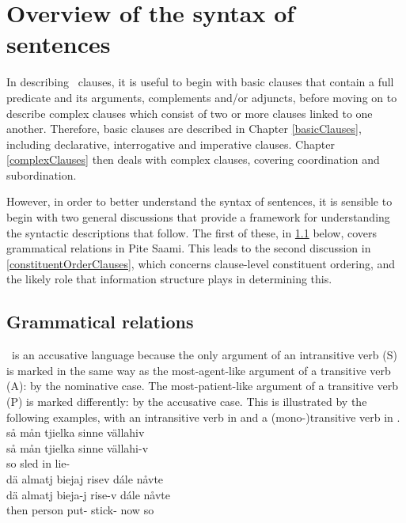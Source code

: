 


\chapter{Overview of the syntax of sentences}\label{overviewSyntax}
In describing \PS\ clauses, it is useful to begin with basic clauses that contain a full predicate and its arguments, complements and/or adjuncts, before moving on to describe complex clauses which consist of two or more clauses linked to one another. 
Therefore, basic clauses are described in Chapter \ref{basicClauses}, including declarative, interrogative and imperative clauses. Chapter \ref{complexClauses} then deals with complex clauses, covering coordination and subordination. 

However, in order to better understand the syntax of sentences, it is sensible to begin with two general discussions that provide a framework for understanding the syntactic descriptions that follow. The first of these, in \SEC\ref{grammaticalRelations} below, covers grammatical relations in Pite Saami. This leads to the second discussion in \SEC\ref{constituentOrderClauses}, which concerns clause-level constituent ordering, and the likely role that information structure plays in determining this.


\section{Grammatical relations}\label{grammaticalRelations}
\PS\ is an accusative language because %
the only argument of an intransitive verb (S) is marked in the same way as the most-agent-like argument of a transitive verb (A): by the nominative case. 
The most-patient-like argument of a transitive verb (P) is marked differently: by the accusative case. This is illustrated by the following examples, with an intransitive verb in  and a (mono-)transitive verb in .
\ea\label{intrans1}
\glll	så mån tjielka sinne vällahiv\\
	så mån tjielka sinne vällahi-v\\
	so  sled\BS{} in lie-\\\nopagebreak
{} 
\z
\ea\label{monotrans1}
\glll	dä almatj biejaj risev dále nåvte\\
	dä almatj bieja-j rise-v dále nåvte\\
	then person\BS{} put- stick- now so\\\nopagebreak
{} 
\z


